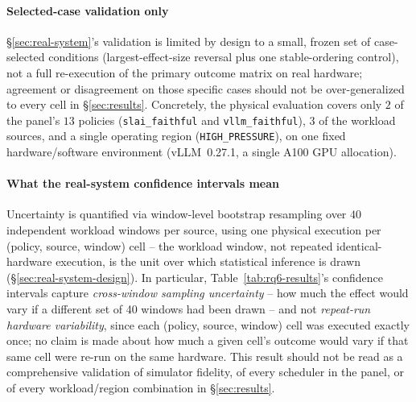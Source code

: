 \paragraph{Selected-case validation only} \S\ref{sec:real-system}'s
validation is limited by design to a small, frozen set of case-selected
conditions (largest-effect-size reversal plus one stable-ordering control),
not a full re-execution of the primary outcome matrix on real hardware;
agreement or disagreement on those specific cases should not be
over-generalized to every cell in \S\ref{sec:results}. Concretely, the
physical evaluation covers only $2$ of the panel's $13$ policies
(\texttt{slai\_faithful} and \texttt{vllm\_faithful}), $3$ of the workload
sources, and a single operating region (\texttt{HIGH\_PRESSURE}), on one
fixed hardware/software environment (vLLM~0.27.1, a single A100 GPU
allocation).

\paragraph{What the real-system confidence intervals mean} Uncertainty is
quantified via window-level bootstrap resampling over $40$ independent
workload windows per source, using one physical execution per (policy,
source, window) cell -- the workload window, not repeated
identical-hardware execution, is the unit over which statistical inference
is drawn (\S\ref{sec:real-system-design}). In particular,
Table~\ref{tab:rq6-results}'s confidence intervals capture
\emph{cross-window sampling uncertainty} -- how much the effect would vary
if a different set of 40 windows had been drawn -- and not
\emph{repeat-run hardware variability}, since each (policy, source, window)
cell was executed exactly once; no claim is made about how much a given
cell's outcome would vary if that same cell were re-run on the same
hardware. This result should not be read as a comprehensive validation of
simulator fidelity, of every scheduler in the panel, or of every
workload/region combination in \S\ref{sec:results}.

